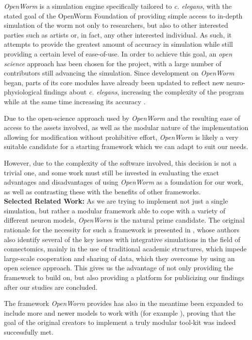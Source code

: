 \documentclass[a4paper,11pt]{article}
\begin{document}
\emph{OpenWorm} is a simulation engine specifically tailored to \emph{c. elegans}, with the stated goal of the OpenWorm Foundation of providing simple access to in-depth simulation of the worm not only to researchers, but also to other interested parties such as artists or, in fact, any other interested individual. As such, it attempts to provide the greatest amount of accuracy in simulation while still providing a certain level of ease-of-use. In order to achieve this goal, an \emph{open science} \citep{nielsen2012reinventing} approach has been chosen for the project, with a large number of contributors still advancing the simulation. Since development on \emph{OpenWorm} began, parts of its core modules have already been updated to reflect new neuro-physiological findings about \emph{c. elegans}, increasing the complexity of the program while at the same time increasing its accuracy \citep{M.2013}.

Due to the open-science approach used by \emph{OpenWorm} and the resulting ease of access to the assets involved, as well as the modular nature of the implementation allowing for modification without prohibitive effort, \emph{OpenWorm} is likely a very suitable candidate for a starting framework which we can adapt to suit our needs.

However, due to the complexity of the software involved, this decision is not a trivial one, and some work must still be invested in evaluating the exact advantages and disadvantages of using \emph{OpenWorm} as a foundation for our work, as well as contrasting these with the benefits of other frameworks.
\\[0,2cm]

\textbf{Selected Related Work:}
As we are trying to implement not just a single simulation, but rather a modular framework able to cope with a variety of different neuron models, \emph{OpenWorm} is the natural prime candidate. The original rationale for the necessity for such a framework is presented in \citep{Szigeti2014}, whose authors also identify several of the key issues with integrative simulations in the field of connectomics, mainly in the use of traditional academic structures, which impede large-scale cooperation and sharing of data, which they overcome by using an open science approach. This gives us the advantage of not only providing the framework to build on, but also providing a platform for publicizing our findings after our studies are concluded.

The framework \emph{OpenWorm} provides has also in the meantime been expanded to include more and newer models to work with (for example \citep{M.2013}), proving that the goal of the original creators to implement a truly modular tool-kit was indeed successfully met.
\end{document}
